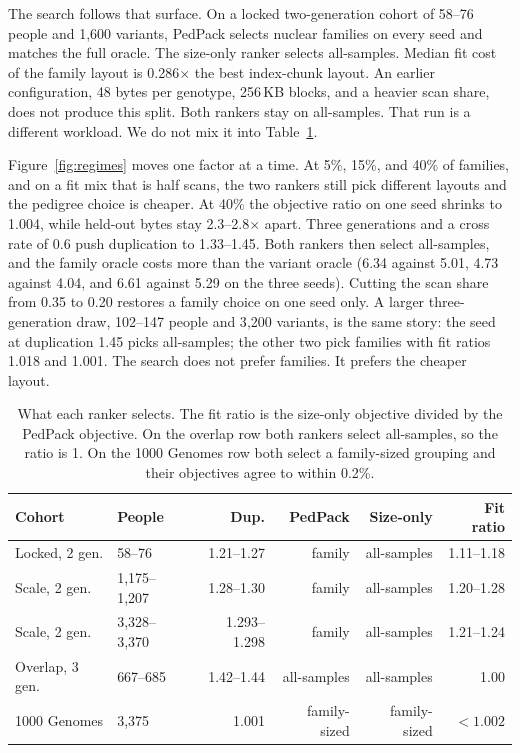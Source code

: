 \documentclass[11pt]{article}
\begin{document}
The search follows that surface.
On a locked two-generation cohort of 58--76 people and 1{,}600 variants, PedPack selects nuclear families on every seed and matches the full oracle.
The size-only ranker selects all-samples.
Median fit cost of the family layout is 0.286$\times$ the best index-chunk layout.
An earlier configuration, 48 bytes per genotype, 256\,KB blocks, and a heavier scan share, does not produce this split.
Both rankers stay on all-samples.
That run is a different workload.
We do not mix it into Table~\ref{tab:cohorts}.

Figure~\ref{fig:regimes} moves one factor at a time.
At 5\%, 15\%, and 40\% of families, and on a fit mix that is half scans, the two rankers still pick different layouts and the pedigree choice is cheaper.
At 40\% the objective ratio on one seed shrinks to 1.004, while held-out bytes stay 2.3--2.8$\times$ apart.
Three generations and a cross rate of 0.6 push duplication to 1.33--1.45.
Both rankers then select all-samples, and the family oracle costs more than the variant oracle (6.34 against 5.01, 4.73 against 4.04, and 6.61 against 5.29 on the three seeds).
Cutting the scan share from 0.35 to 0.20 restores a family choice on one seed only.
A larger three-generation draw, 102--147 people and 3{,}200 variants, is the same story: the seed at duplication 1.45 picks all-samples; the other two pick families with fit ratios 1.018 and 1.001.
The search does not prefer families.
It prefers the cheaper layout.

\begin{table}[t]
  \centering
  \caption{What each ranker selects.
  The fit ratio is the size-only objective divided by the PedPack objective.
  On the overlap row both rankers select all-samples, so the ratio is 1.
  On the 1000 Genomes row both select a family-sized grouping and their objectives agree to within 0.2\%.}
  \label{tab:cohorts}
  \begin{tabular}{@{}llrrrr@{}}
    \toprule
    Cohort & People & Dup. & PedPack & Size-only & Fit ratio \\
    \midrule
    Locked, 2 gen. & 58--76 & 1.21--1.27 & family & all-samples & 1.11--1.18 \\
    Scale, 2 gen. & 1{,}175--1{,}207 & 1.28--1.30 & family & all-samples & 1.20--1.28 \\
    Scale, 2 gen. & 3{,}328--3{,}370 & 1.293--1.298 & family & all-samples & 1.21--1.24 \\
    Overlap, 3 gen. & 667--685 & 1.42--1.44 & all-samples & all-samples & 1.00 \\
    1000 Genomes & 3{,}375 & 1.001 & family-sized & family-sized & $< 1.002$ \\
    \bottomrule
  \end{tabular}
\end{table}
\end{document}
